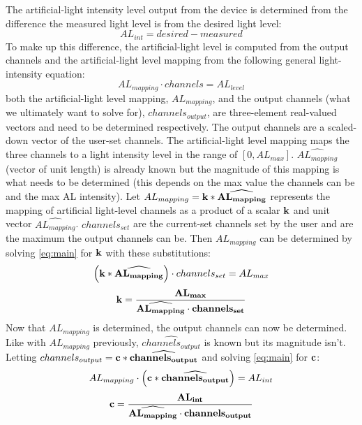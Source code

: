 \documentclass{article}
\begin{document}
%
The artificial-light intensity level output from the device is determined from the difference the measured light level is from the desired light level:
%
\begin{equation} \label{eq:AL_int}
AL_{int} = desired - measured
\end{equation}
%
To make up this difference, the artificial-light level is computed from the output channels and the artificial-light level mapping from the following general light-intensity equation:
\begin{equation} \label{eq:main}
AL_{mapping} \cdot channels = AL_{level}
\end{equation}
%
both the artificial-light level mapping, $AL_{mapping}$, and the output channels (what we ultimately want to solve for), $channels_{output}$, are three-element real-valued vectors and need to be determined respectively.
The output channels are a scaled-down vector of the user-set channels.
The artificial-light level mapping maps the three channels to a light intensity level in the range of $[0, AL_{max}]$.
$\widehat{AL_{mapping}}$ (vector of unit length) is already known but the magnitude of this mapping is what needs to be determined (this depends on the max value the channels can be and the max AL intensity).
Let $AL_{mapping} = \bf{k} * \widehat{AL_{mapping}}$ represents the mapping of artificial light-level channels as a product of a scalar $\bf{k}$ and unit vector $\widehat{AL_{mapping}}$. $channels_{set}$ are the current-set channels set by the user and are the maximum the output channels can be.
Then $AL_{mapping}$ can be determined by solving \eqref{eq:main} for $\bf{k}$ with these substitutions:
%
\begin{equation} \label{eq:AL_mapping}
\left(\bf{k} * \widehat{AL_{mapping}} \right) \cdot channels_{set} = AL_{max}
\end{equation}
%
\begin{equation}
\bf{k} = \frac{AL_{max}}{\widehat{AL_{mapping}} \cdot channels_{set}}
\end{equation}
%
Now that $AL_{mapping}$ is determined, the output channels can now be determined.
Like with $AL_{mapping}$ previously, $\widehat{channels_{output}}$ is known but its magnitude isn't. Letting $channels_{output} = \bf{c} * \widehat{channels_{output}}$ and solving \eqref{eq:main} for $\bf{c}$:
%
\begin{equation}
AL_{mapping} \cdot \left( \bf{c} * \widehat{channels_{output}} \right) = AL_{int}
\end{equation}
%
\begin{equation}
\bf{c} = \frac{AL_{int}}{\widehat{AL_{mapping}} \cdot channels_{output}}
\end{equation}
%
\end{document}
